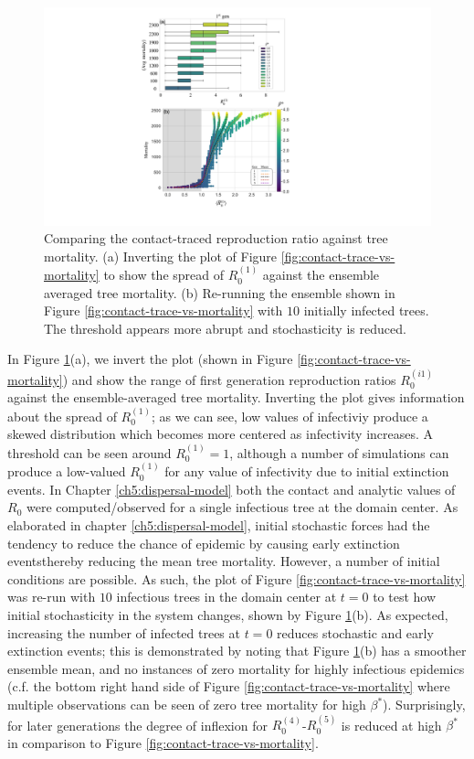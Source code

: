 \begin{figure}
    \centering
    \includegraphics[scale=0.60]{chapter5/figures/fig6-R0-contact-vs-mortality-A.pdf}
    \caption{Comparing the contact-traced reproduction ratio against tree mortality. (a) Inverting the plot of Figure \ref{fig:contact-trace-vs-mortality} to show the spread of $R_0^{(1)}$ against the ensemble averaged tree mortality. (b)
    Re-running the ensemble shown in Figure \ref{fig:contact-trace-vs-mortality} with $10$ initially infected trees. The threshold appears more abrupt and stochasticity is reduced.}
    \label{fig:R0-contact-vs-morality-A}
\end{figure}

In Figure \ref{fig:R0-contact-vs-morality-A}(a), we invert the plot (shown in Figure \ref{fig:contact-trace-vs-mortality}) and show the range of first generation reproduction ratios $R_0^{(i1)}$ against the ensemble-averaged tree mortality.
Inverting the plot gives information about the spread of $R_0^{(1)}$;
as we can see, low values of infectiviy produce a skewed distribution which becomes more centered as infectivity increases.
A threshold can be seen around $R_0^{(1)}=1$, although a number of simulations can produce a low-valued $R_0^{(1)}$ for any value of infectivity due to initial extinction events.
In Chapter \ref{ch5:dispersal-model} both the contact and analytic values of $R_0$ were computed/observed for a single infectious tree at the domain center.
As elaborated in chapter \ref{ch5:dispersal-model}, initial stochastic forces had the tendency to reduce the chance of epidemic by causing early extinction events\textemdash thereby reducing the mean tree mortality.
However, a number of initial conditions are possible.
As such, the plot of Figure \ref{fig:contact-trace-vs-mortality} was re-run with $10$ infectious trees in the domain center at $t=0$ to test how initial stochasticity in the system changes, shown by Figure \ref{fig:R0-contact-vs-morality-A}(b).
As expected, increasing the number of infected trees at $t=0$ reduces stochastic and early extinction events;
this is demonstrated by noting that Figure \ref{fig:R0-contact-vs-morality-A}(b) has a smoother ensemble mean, and no instances of zero mortality for highly infectious epidemics (c.f. the bottom right hand side of Figure \ref{fig:contact-trace-vs-mortality} where multiple observations can be seen of zero tree mortality for high $\beta^*$).
Surprisingly, for later generations the degree of inflexion for $R_0^{(4)}$-$R_0^{(5)}$ is reduced at high $\beta^*$ in comparison to Figure \ref{fig:contact-trace-vs-mortality}.

